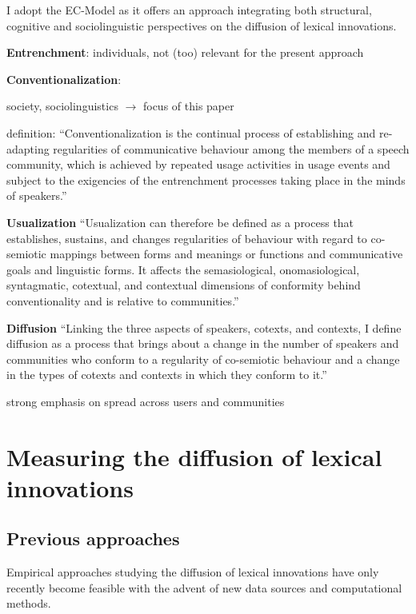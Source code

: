 \documentclass[a4paper]{scrartcl}
\renewcommand{\hw}[1]{\textbf{#1}}
\begin{document}
    I adopt the EC-Model as it offers an approach integrating both structural, cognitive and sociolinguistic perspectives on the diffusion of lexical innovations.

    \hw{Entrenchment}: individuals, not (too) relevant for the present approach

    \hw{Conventionalization}:

      society, sociolinguistics $\rightarrow$ focus of this paper

      definition: \enquote{Conventionalization is the continual process of establishing and re-adapting regularities of communicative behaviour among the members of a speech community, which is achieved by repeated usage activities in usage events and subject to the exigencies of the entrenchment processes taking place in the minds of speakers.}~\parencite{Schmid2020}

    \hw{Usualization} \enquote{Usualization can therefore be defined as a process that establishes, sustains, and changes regularities of behaviour with regard to co-semiotic mappings between forms and meanings or functions and communicative goals and linguistic forms. It affects the semasiological, onomasiological, syntagmatic, cotextual, and contextual dimensions of conformity behind conventionality and is relative to communities.}~\parencite{Schmid2020}

    \hw{Diffusion} \enquote{Linking the three aspects of speakers, cotexts, and contexts, I define diffusion as a process that brings about a change in the number of speakers and communities who conform to a regularity of co-semiotic behaviour and a change in the types of cotexts and contexts in which they conform to it.}~\parencite{Schmid2020}

    strong emphasis on spread across users and communities

\section{Measuring the diffusion of lexical innovations}

  \subsection{Previous approaches}

    Empirical approaches studying the diffusion of lexical innovations have only recently become feasible with the advent of new data sources and computational methods.
\end{document}
